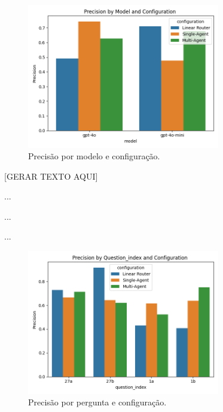                 \begin{figure}[h!]
                    \centering              
                    \includegraphics[width=0.75\textwidth]{images_part_2/model_precision_model_configuration.png}
                    \caption{Precisão por modelo e configuração.}
                    \label{fig:aaaa}
                \end{figure}
                
                [GERAR TEXTO AQUI]

                ...

                ...

                ...

                \begin{figure}[h!]
                    \centering              
                    \includegraphics[width=0.75\textwidth]{images_part_2/question_precision_question_index_configuration.png}
                    \caption{Precisão por pergunta e configuração.}
                    \label{fig:aaaa}
                \end{figure}    

